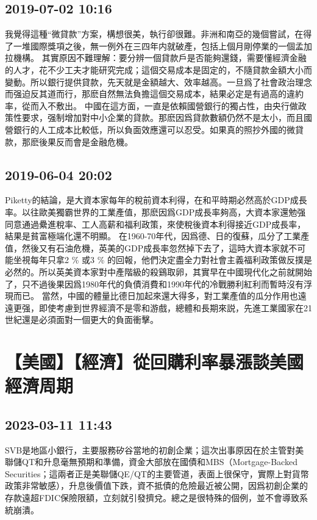\documentclass[twocolumn]{ctexart}
\begin{document}
\subsection*{2019-07-02 10:16}

我覺得這種“微貸款”方案，構想很美，執行卻很難。非洲和南亞的幾個嘗試，在得了一堆國際獎項之後，無一例外在三四年内就破產，包括上個月剛停業的一個孟加拉機構。
其實原因不難理解：要分辨一個貸款戶是否能夠還錢，需要懂經濟金融的人才，花不少工夫才能研究完成；這個交易成本是固定的，不隨貸款金額大小而變動。所以銀行提供貸款，先天就是金額越大、效率越高。一旦爲了社會政治理念而强迫反其道而行，那麽自然無法負擔這個交易成本，結果必定是有過高的違約率，從而入不敷出。
中國在這方面，一直是依賴國營銀行的獨占性，由央行做政策性要求，强制增加對中小企業的貸款。那麽因爲貸款數額仍然不是太小，而且國營銀行的人工成本比較低，所以負面效應還可以忍受。如果真的照抄外國的微貸款，那麽後果反而會是金融危機。
\subsection*{2019-06-04 20:02}

Piketty的結論，是大資本家每年的稅前資本利得，在和平時期必然高於GDP成長率。以往歐美獨霸世界的工業產值，那麽因爲GDP成長率夠高，大資本家還勉强同意通過纍進稅率、工人高薪和福利政策，來使稅後資本利得接近GDP成長率，結果是貧富極端化還不明顯。 
在1960-70年代，因爲德、日的復蘇，瓜分了工業產值，然後又有石油危機，英美的GDP成長率忽然掉下去了，這時大資本家就不可能坐視每年只拿2 \% 或3 \% 的回報，他們決定盡全力對社會主義福利政策做反撲是必然的。所以英美資本家對中產階級的殺鷄取卵，其實早在中國現代化之前就開始了，只不過後果因爲1980年代的負債消費和1990年代的冷戰勝利紅利而暫時沒有浮現而已。 
當然，中國的體量比德日加起來還大得多，對工業產值的瓜分作用也遠遠更强，即使考慮到世界經濟不是零和游戲，總體和長期來説，先進工業國家在21世紀還是必須面對一個更大的負面衝擊。
\section*{【美國】【經濟】從回購利率暴漲談美國經濟周期}
\subsection*{2023-03-11 11:43}

SVB是地區小銀行，主要服務矽谷當地的初創企業；這次出事原因在於主管對美聯儲QT和升息毫無預期和準備，資金大部放在國債和MBS（Mortgage-Backed Securities；這兩者正是美聯儲QE/QT的主要管道，表面上很保守，實際上對貨幣政策非常敏感），升息後價值下跌，資不抵債的危險最近被公開，因爲初創企業的存款遠超FDIC保險限額，立刻就引發擠兌。總之是很特殊的個例，並不會導致系統崩潰。
\end{document}
